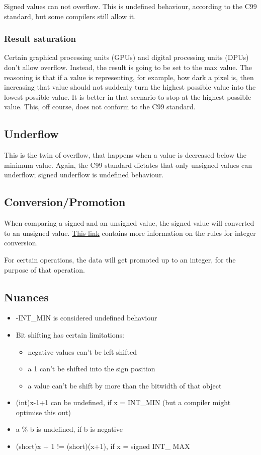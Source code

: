 \documentclass[letterpaper]{article}
\newcommand{\p}{\vspace{1em}\par}		%
\begin{document}
\p Signed values can not overflow. This is undefined behaviour, according to the C99 standard, but some compilers still allow it.

\subsubsection{Result saturation}
Certain graphical processing units (GPUs) and digital processing units (DPUs) don't allow overflow. Instead, the result is going to be set to the max value. The reasoning is that if a value is representing, for example, how dark a pixel is, then increasing that value should not suddenly turn the highest possible value into the lowest possible value. It is better in that scenario to stop at the highest possible value. This, off course, does not conform to the C99 standard.

\subsection{Underflow}
This is the twin of overflow, that happens when a value is decreased below the minimum value. Again, the C99 standard dictates that only unsigned values can underflow; signed underflow is undefined behaviour.

\subsection{Conversion/Promotion}
When comparing a signed and an unsigned value, the signed value will converted to an unsigned value. 
\href{https://www.securecoding.cert.org/confluence/display/seccode/INT02-
C.+Understand+integer+conversion+rules
}{This link} contains more information on the rules for integer conversion.

\p For certain operations, the data will get promoted up to an integer, for the purpose of that operation.

\subsection{Nuances}
\begin{itemize}
\item -INT\_MIN is considered undefined behaviour
\item Bit shifting has certain limitations:
	\begin{itemize}
	\item negative values can't be left shifted
	\item a 1 can't be shifted into the sign position
	\item a value can't be shift by more than the bitwidth of that object
	\end{itemize}
\item (int)x-1+1 can be undefined, if x = INT\_MIN (but a compiler might optimise this out)
\item a \% b is undefined, if b is negative
\item (short)x + 1 != (short)(x+1), if x = signed INT\_ MAX
\end{itemize}
\end{document}
